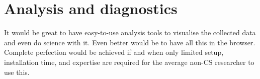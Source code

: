 \documentclass{sig-alternate}
\begin{document}
	
\begin{comment}
{	\bf A screenshot would be nice. 

	Established tests (see below) included as `presets' in the build-your-own-test page. }
\end{comment}

\section{Analysis and diagnostics}
	It would be great to have easy-to-use analysis tools to visualise the collected data and even do science with it. Even better would be to have all this in the browser. Complete perfection would be achieved if and when only limited setup, installation time, and expertise are required for the average non-CS researcher to use this. 
	
\end{document}
